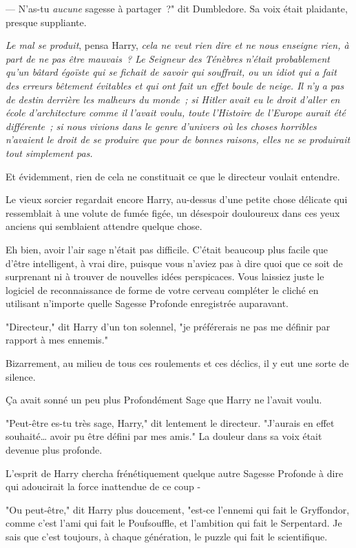 --- N'as-tu \emph{aucune} sagesse à partager~?" dit Dumbledore. Sa voix était plaidante, presque suppliante.

\emph{Le mal se produit}, pensa Harry, \emph{cela ne veut rien dire et ne nous enseigne rien, à part de ne pas être mauvais~? Le Seigneur des Ténèbres n'était probablement qu'un bâtard égoïste qui se fichait de savoir qui souffrait, ou un idiot qui a fait des erreurs bêtement évitables et qui ont fait un effet boule de neige. Il n'y a pas de destin derrière les malheurs du monde~; si Hitler avait eu le droit d'aller en école d'architecture comme il l'avait voulu, toute l'Histoire de l'Europe aurait été différente~; si nous vivions dans le genre d'univers où les choses horribles n'avaient le droit de se produire que pour de bonnes raisons, elles ne se produirait tout simplement pas.}

Et évidemment, rien de cela ne constituait ce que le directeur voulait entendre.

Le vieux sorcier regardait encore Harry, au-dessus d'une petite chose délicate qui ressemblait à une volute de fumée figée, un désespoir douloureux dans ces yeux anciens qui semblaient attendre quelque chose.

Eh bien, avoir l'air sage n'était pas difficile. C'était beaucoup plus facile que d'être intelligent, à vrai dire, puisque vous n'aviez pas à dire quoi que ce soit de surprenant ni à trouver de nouvelles idées perspicaces. Vous laissiez juste le logiciel de reconnaissance de forme de votre cerveau compléter le cliché en utilisant n'importe quelle Sagesse Profonde enregistrée auparavant.

"Directeur," dit Harry d'un ton solennel, "je préférerais ne pas me définir par rapport à mes ennemis."

Bizarrement, au milieu de tous ces roulements et ces déclics, il y eut une sorte de silence.

Ça avait sonné un peu plus Profondément Sage que Harry ne l'avait voulu.

"Peut-être es-tu très sage, Harry," dit lentement le directeur. "J'aurais en effet souhaité… avoir pu être défini par mes amis." La douleur dans sa voix était devenue plus profonde.

L'esprit de Harry chercha frénétiquement quelque autre Sagesse Profonde à dire qui adoucirait la force inattendue de ce coup -

"Ou peut-être," dit Harry plus doucement, "est-ce l'ennemi qui fait le Gryffondor, comme c'est l'ami qui fait le Poufsouffle, et l'ambition qui fait le Serpentard. Je sais que c'est toujours, à chaque génération, le puzzle qui fait le scientifique.


